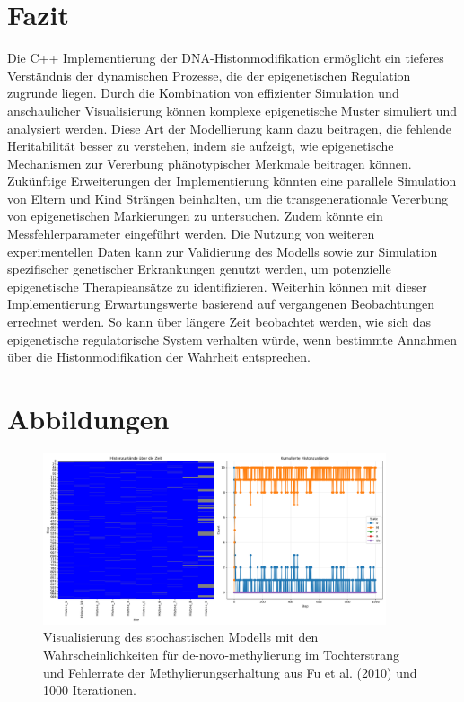 \documentclass{SeminarV2}
\begin{document}
\section{Fazit}
Die C++ Implementierung der DNA-Histonmodifikation erm\"{o}glicht ein tieferes Verst\"{a}ndnis der dynamischen Prozesse, die der epigenetischen Regulation zugrunde liegen. Durch die Kombination von effizienter Simulation und anschaulicher Visualisierung k\"{o}nnen komplexe epigenetische Muster simuliert und analysiert werden.
Diese Art der Modellierung kann dazu beitragen, die fehlende Heritabilit\"{a}t besser zu verstehen, indem sie aufzeigt, wie epigenetische Mechanismen zur Vererbung ph\"{a}notypischer Merkmale beitragen k\"{o}nnen. 
Zuk\"{u}nftige Erweiterungen der Implementierung k\"{o}nnten eine parallele Simulation von Eltern und Kind Str\"{a}ngen beinhalten, um die transgenerationale Vererbung von epigenetischen Markierungen zu untersuchen.
Zudem könnte ein Messfehlerparameter eingeführt werden.
Die Nutzung von weiteren experimentellen Daten kann zur Validierung des Modells sowie zur Simulation spezifischer genetischer Erkrankungen genutzt werden, um potenzielle epigenetische Therapieans\"{a}tze zu identifizieren.
Weiterhin können mit dieser Implementierung Erwartungswerte basierend auf vergangenen Beobachtungen errechnet werden. So kann \"{u}ber l\"{a}ngere Zeit beobachtet werden, wie sich das epigenetische regulatorische System verhalten w\"{u}rde, wenn bestimmte Annahmen \"{u}ber die Histonmodifikation der Wahrheit entsprechen.

\section{Abbildungen}


\begin{figure}[htbp]
  \centering
  \includegraphics[width=0.9\textwidth]{images/Histone_Fu_1000.png}
  \caption{Visualisierung des stochastischen Modells mit den Wahrscheinlichkeiten für de-novo-methylierung im Tochterstrang und Fehlerrate der Methylierungserhaltung aus Fu et al. (2010) und 1000 Iterationen. \cite{fu-2010}}
  \label{fig:Fu_1000}
\end{figure}
\end{document}
